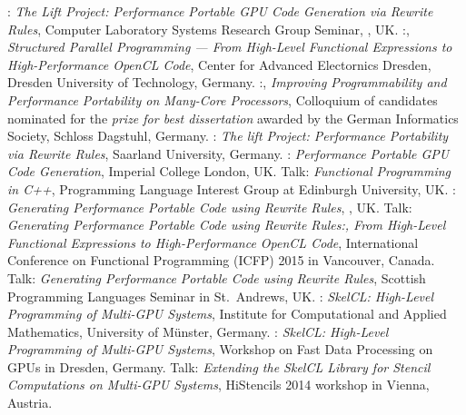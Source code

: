          {: \emph{The Lift Project: Performance Portable GPU Code Generation via Rewrite Rules},
         Computer Laboratory Systems Research Group Seminar, , UK.
         }
         {:, \emph{Structured Parallel Programming --- From High-Level Functional Expressions to High-Performance OpenCL Code},
         Center for Advanced Electornics Dresden, Dresden University of Technology, Germany.
         }
         {:, \emph{Improving Programmability and Performance Portability on Many-Core Processors},
         \small Colloquium of candidates nominated for the \emph{prize for best dissertation} awarded by the German Informatics Society, Schloss Dagstuhl, Germany.}
         {: \emph{The lift Project: Performance Portability via Rewrite Rules},
          \small Saarland University, Germany.}
         {: \emph{Performance Portable GPU Code Generation},
         \small Imperial College London, UK.}
         {Talk: \emph{Functional Programming in C++},
         \small Programming Language Interest Group at Edinburgh University, UK.}
         {: \emph{Generating Performance Portable Code using Rewrite Rules},
         \small {}, UK.}
         {Talk: \emph{Generating Performance Portable Code using Rewrite Rules:, From High-Level Functional Expressions to High-Performance OpenCL Code},
         \small International Conference on Functional Programming (ICFP) 2015 in Vancouver, Canada.}
         {Talk: \emph{Generating Performance Portable Code using Rewrite Rules},
         \small Scottish Programming Languages Seminar in St.\ Andrews, UK.}
         {: \emph{SkelCL\@: High-Level Programming of Multi-GPU
          Systems}, \small Institute for Computational and Applied
          Mathematics, University of Münster, Germany.}
         {: \emph{SkelCL\@: High-Level Programming of Multi-GPU
          Systems}, \small Workshop on Fast Data Processing on GPUs in
          Dresden, Germany.}
         {Talk: \emph{Extending the SkelCL Library for Stencil
          Computations on Multi-GPU Systems}, \small HiStencils 2014
          workshop in Vienna, Austria.}
